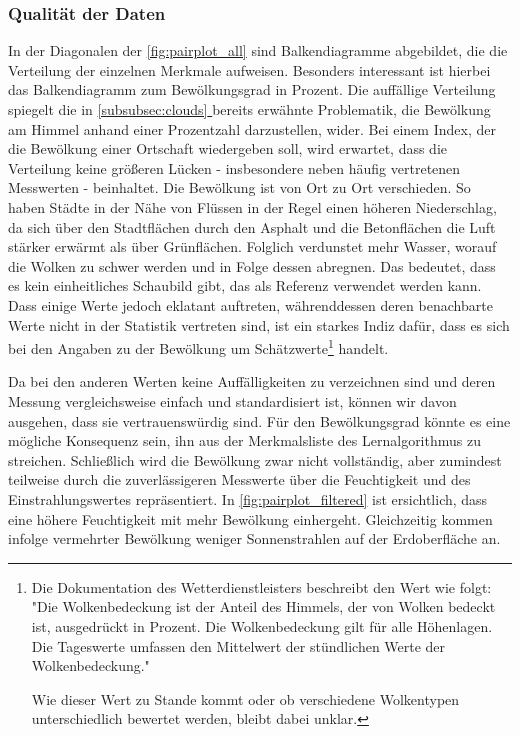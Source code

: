 \documentclass[12pt, a4paper]{article}
\newcommand*{\fullref}[1]{\hyperref[{#1}]{\autoref*{#1} \textit{\nameref*{#1}}}}
\begin{document}
\subsubsection{Qualität der Daten}
\label{subsubsec:quality_data}

In der Diagonalen der \autoref{fig:pairplot_all} sind Balkendiagramme abgebildet, die die Verteilung der einzelnen Merkmale aufweisen. Besonders interessant ist hierbei das Balkendiagramm zum Bewölkungsgrad in Prozent. Die auffällige Verteilung spiegelt die in \fullref{subsubsec:clouds} bereits erwähnte Problematik, die Bewölkung am Himmel anhand einer Prozentzahl darzustellen, wider. Bei einem Index, der die Bewölkung einer Ortschaft wiedergeben soll, wird erwartet, dass die Verteilung keine größeren Lücken - insbesondere neben häufig vertretenen Messwerten - beinhaltet. Die Bewölkung ist von Ort zu Ort verschieden. So haben Städte in der Nähe von Flüssen in der Regel einen höheren Niederschlag, da sich über den Stadtflächen durch den Asphalt und die Betonflächen die Luft stärker erwärmt als über Grünflächen. Folglich verdunstet mehr Wasser, worauf die Wolken zu schwer werden und in Folge dessen abregnen. Das bedeutet, dass es kein einheitliches Schaubild gibt, das als Referenz verwendet werden kann. Dass einige Werte jedoch eklatant auftreten, währenddessen deren benachbarte Werte nicht in der Statistik vertreten sind, ist ein starkes Indiz dafür, dass es sich bei den Angaben zu der Bewölkung um Schätzwerte\footnote{Die Dokumentation des Wetterdienstleisters beschreibt den Wert wie folgt: "Die Wolkenbedeckung ist der Anteil des Himmels, der von Wolken bedeckt ist, ausgedrückt in Prozent. Die Wolkenbedeckung gilt für alle Höhenlagen. Die Tageswerte umfassen den Mittelwert der stündlichen Werte der Wolkenbedeckung."

Wie dieser Wert zu Stande kommt oder ob verschiedene Wolkentypen unterschiedlich bewertet werden, bleibt dabei unklar.} handelt.

Da bei den anderen Werten keine Auffälligkeiten zu verzeichnen sind und deren Messung vergleichsweise einfach und standardisiert ist, können wir davon ausgehen, dass sie vertrauenswürdig sind. Für den Bewölkungsgrad könnte es eine mögliche Konsequenz sein, ihn aus der Merkmalsliste des Lernalgorithmus zu streichen. Schließlich wird die Bewölkung zwar nicht vollständig, aber zumindest teilweise durch die zuverlässigeren Messwerte über die Feuchtigkeit und des Einstrahlungswertes repräsentiert. In \autoref{fig:pairplot_filtered} ist ersichtlich, dass eine höhere Feuchtigkeit mit mehr Bewölkung einhergeht. Gleichzeitig kommen infolge vermehrter Bewölkung weniger Sonnenstrahlen auf der Erdoberfläche an. 
\end{document}

